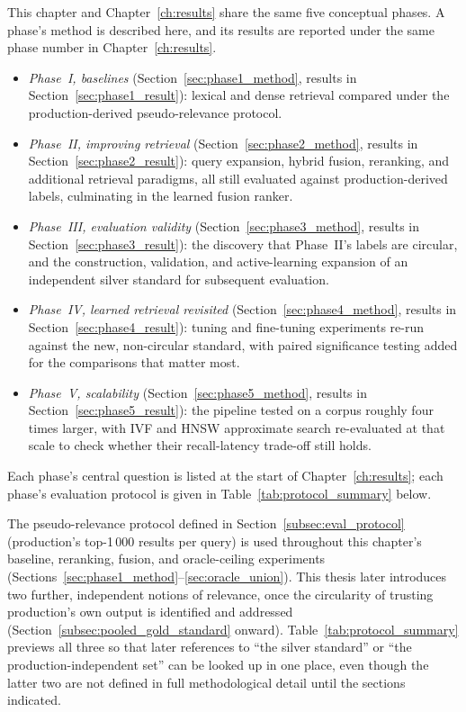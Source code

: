 \documentclass[a4paper,oneside,bibliography=totoc]{scrbook}
\begin{document}
This chapter and Chapter~\ref{ch:results} share the same five conceptual phases. A phase's method is described here, and its results are reported under the same phase number in Chapter~\ref{ch:results}.
\begin{itemize}
\setlength\itemsep{0pt}
\setlength\parskip{0pt}
\item \emph{Phase~I, baselines} (Section~\ref{sec:phase1_method}, results in Section~\ref{sec:phase1_result}): lexical and dense retrieval compared under the production-derived pseudo-relevance protocol.
\item \emph{Phase~II, improving retrieval} (Section~\ref{sec:phase2_method}, results in Section~\ref{sec:phase2_result}): query expansion, hybrid fusion, reranking, and additional retrieval paradigms, all still evaluated against production-derived labels, culminating in the learned fusion ranker.
\item \emph{Phase~III, evaluation validity} (Section~\ref{sec:phase3_method}, results in Section~\ref{sec:phase3_result}): the discovery that Phase~II's labels are circular, and the construction, validation, and active-learning expansion of an independent silver standard for subsequent evaluation.
\item \emph{Phase~IV, learned retrieval revisited} (Section~\ref{sec:phase4_method}, results in Section~\ref{sec:phase4_result}): tuning and fine-tuning experiments re-run against the new, non-circular standard, with paired significance testing added for the comparisons that matter most.
\item \emph{Phase~V, scalability} (Section~\ref{sec:phase5_method}, results in Section~\ref{sec:phase5_result}): the pipeline tested on a corpus roughly four times larger, with IVF and HNSW approximate search re-evaluated at that scale to check whether their recall-latency trade-off still holds.
\end{itemize}
Each phase's central question is listed at the start of Chapter~\ref{ch:results}; each phase's evaluation protocol is given in Table~\ref{tab:protocol_summary} below.

\label{sec:protocol_note}

The pseudo-relevance protocol defined in Section~\ref{subsec:eval_protocol} (production's top-1\,000 results per query) is used throughout this chapter's baseline, reranking, fusion, and oracle-ceiling experiments (Sections~\ref{sec:phase1_method}--\ref{sec:oracle_union}). This thesis later introduces two further, independent notions of relevance, once the circularity of trusting production's own output is identified and addressed (Section~\ref{subsec:pooled_gold_standard} onward). Table~\ref{tab:protocol_summary} previews all three so that later references to ``the silver standard'' or ``the production-independent set'' can be looked up in one place, even though the latter two are not defined in full methodological detail until the sections indicated.
\end{document}

